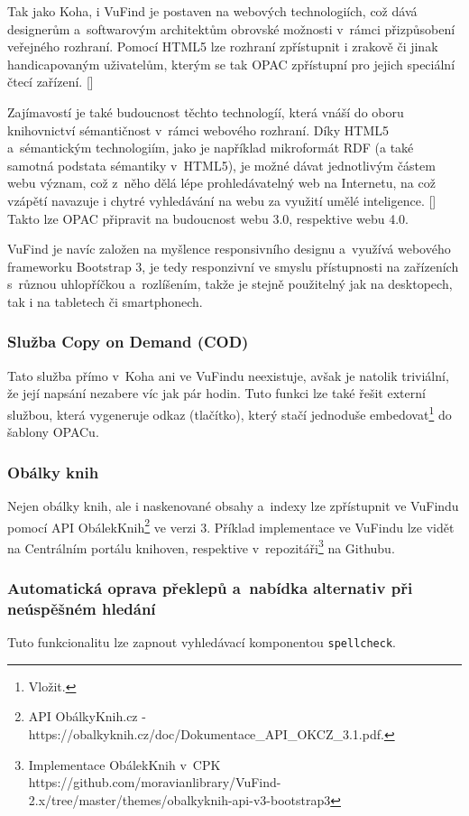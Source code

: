 \documentclass[
	11pt, oneside, printed, final, palatino, monochrome
	microtype,
	table,   %
	lof,     %
	lot     %
]{fithesis3}
\newcommand{\citepages}[2]{[\cite[#1]{#2}]}
\newcommand{\code}[1]{\texttt{#1}}
\begin{document}
{Tak jako Koha, i VuFind je postaven na webových technologiích, což dává designerům a~softwarovým architektům obrovské možnosti v~rámci přizpůsobení veřejného rozhraní. Pomocí HTML5 lze rozhraní zpřístupnit i zrakově či jinak handicapovaným uživatelům, kterým se tak OPAC zpřístupní pro jejich speciální čtecí zařízení. \citepages{19-27}{Hogan2011}

Zajímavostí je také budoucnost těchto technologíí, která vnáší do oboru knihovnictví sémantičnost v~rámci webového rozhraní. Díky HTML5 a~sémantickým technologiím, jako je například mikroformát RDF (a také samotná podstata sémantiky v~HTML5), je možné dávat jednotlivým částem webu význam, což z~něho dělá lépe prohledávatelný web na Internetu, na což vzápětí navazuje i chytré vyhledávání na webu za využití umělé inteligence. \citepages{70-77}{fay_sauers_2012} Takto lze OPAC připravit na budoucnost webu 3.0, respektive webu 4.0.

VuFind je navíc založen na myšlence responsivního designu a~využívá webového frameworku  Bootstrap 3, je tedy responzivní ve smyslu přístupnosti na zařízeních s~různou uhlopříčkou a~rozlíšením, takže je stejně použitelný jak na desktopech, tak i na tabletech či smartphonech.

\subsubsection{Služba Copy on Demand (COD)}
Tato služba přímo v~Koha ani ve VuFindu neexistuje, avšak je natolik triviální, že její napsání nezabere víc jak pár hodin. Tuto funkci lze také řešit externí službou, která vygeneruje odkaz (tlačítko), který stačí jednoduše embedovat\footnote{Vložit.} do šablony OPACu.


\subsubsection{Obálky knih}
Nejen obálky knih, ale i naskenované obsahy a~indexy lze zpřístupnit ve VuFindu pomocí API ObálekKnih\footnote{API ObálkyKnih.cz - https://obalkyknih.cz/doc/Dokumentace\_API\_OKCZ\_3.1.pdf.} ve verzi 3. Příklad implementace ve VuFindu lze vidět na Centrálním portálu knihoven, respektive v~repozitáři\footnote{Implementace ObálekKnih v~CPK https://github.com/moravianlibrary/VuFind-2.x/tree/master/themes/obalkyknih-api-v3-bootstrap3} na Githubu.

\subsubsection{Automatická oprava překlepů a~nabídka alternativ při neúspěšném hledání}
Tuto funkcionalitu lze zapnout vyhledávací komponentou \code{spellcheck}.

}
\end{document}
